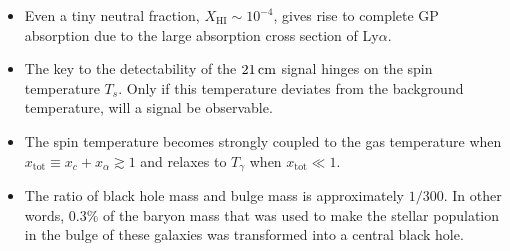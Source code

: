 \documentclass[a4paper,11pt]{article}
\begin{document}
\begin{itemize}
    \item Even a tiny neutral fraction, $X_\mathrm{HI}\sim10^{-4}$, gives rise to complete GP absorption due to the large absorption cross section of Ly$\alpha$.
    \item The key to the detectability of the $21\,{\rm cm}$ signal hinges on the spin temperature $T_s$. Only if this temperature deviates from the background temperature, will a signal be observable.
    \item The spin temperature becomes strongly coupled to the gas temperature when $x_\mathrm{tot}\equiv x_c+x_\alpha\gtrsim1$ and relaxes to $T_\gamma$ when $x_\mathrm{tot}\ll1$.
    \item The ratio of black hole mass and bulge mass is approximately $1/300$. In other words, 0.3\% of the baryon mass that was used to make the stellar population in the bulge of these galaxies was transformed into a central black hole.
    \end{itemize}
\end{document}
